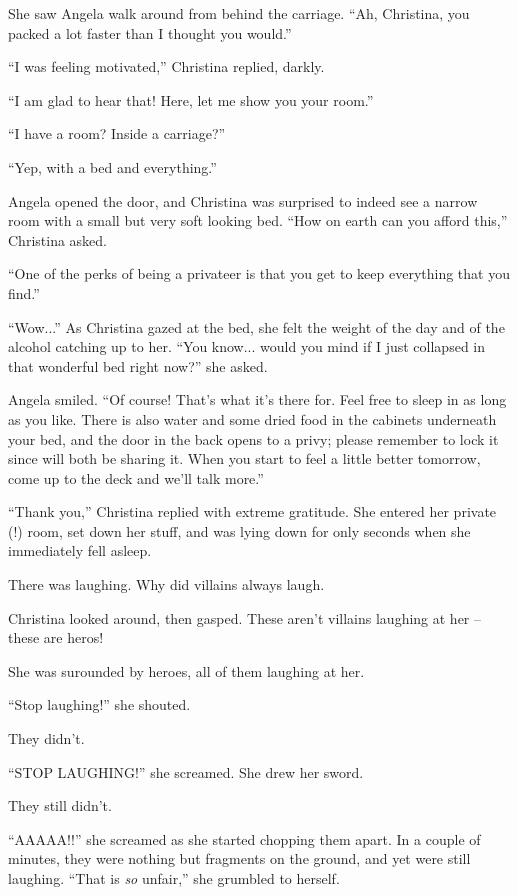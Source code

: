 \documentclass[showtrims,b6paper,draft,10pt]{memoir}
\begin{document}
She saw Angela walk around from behind the carriage.  ``Ah, Christina, you packed a lot faster than I thought you would.''

``I was feeling motivated,'' Christina replied, darkly.

``I am glad to hear that!  Here, let me show you your room.''

``I have a room?  Inside a carriage?''

``Yep, with a bed and everything.''

Angela opened the door, and Christina was surprised to indeed see a narrow room with a small but very soft looking bed.  ``How on earth can you afford this,'' Christina asked.

``One of the perks of being a privateer is that you get to keep everything that you find.''

``Wow...'' As Christina gazed at the bed, she felt the weight of the day and of the alcohol catching up to her.  ``You know... would you mind if I just collapsed in that wonderful bed right now?''  she asked.

Angela smiled.  ``Of course!  That's what it's there for.  Feel free to sleep in as long as you like.  There is also water and some dried food in the cabinets underneath your bed, and the door in the back opens to a privy;  please remember to lock it since will both be sharing it.  When you start to feel a little better tomorrow, come up to the deck and we'll talk more.''

``Thank you,'' Christina replied with extreme gratitude.  She entered her private (!) room, set down her stuff, and was lying down for only seconds when she immediately fell asleep.

\timeskip
There was laughing.  Why did villains always laugh.

Christina looked around, then gasped.  These aren't villains laughing at her -- these are heros!

She was surounded by heroes, all of them laughing at her.

``Stop laughing!''  she shouted.

They didn't.

``STOP LAUGHING!''  she screamed.  She drew her sword.

They still didn't.

``AAAAA!!'' she screamed as she started chopping them apart.  In a couple of minutes, they were nothing but fragments on the ground, and yet were still laughing.  ``That is \emph{so} unfair,'' she grumbled to herself.
\end{document}
